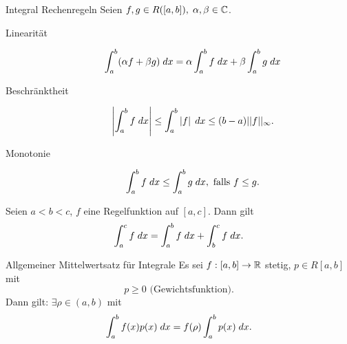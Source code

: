 \documentclass[main.tex]{subfiles}
\begin{document}
\begin{karte}{Integral Rechenregeln}
    Seien \( f,g \in R([a,b]),\; \alpha, \beta \in \C \).
    \begin{description}
        \item[Linearität] \[ \integral{(\alpha f + \beta g)}{a}{b}
        = \alpha \integral{f}{a}{b} + \beta \integral{g}{a}{b} \]
        \item[Beschränktheit] \[ \abs{\integral{f}{a}{b}} \leq 
        \integral{\abs{f}}{a}{b} 
        \leq (b-a)||f||_\infty. \]
        \item[Monotonie] \[ \integral{f}{a}{b} 
        \leq \integral{g}{a}{b}, \text{ falls } f \leq g. \]
    \end{description}
    Seien \( a < b < c \), \(f\) eine Regelfunktion auf 
    \( [a,c] \). Dann gilt 
    \[ \integral{f}{a}{c} 
    = \integral{f}{a}{b} + \integral{f}{b}{c}. \]
\end{karte}

\begin{karte}{Allgemeiner Mittelwertsatz für Integrale}
    Es sei \( \abb{f}{[a,b]}{\R} \) stetig, 
    \( p \in R[a,b] \) mit 
    \[ p \geq 0 \text{ (Gewichtsfunktion)}. \]
    Dann gilt: \( \exists \rho \in (a,b) \) mit 
    \[ \integral{f(x) p(x)}{a}{b} 
    = f(\rho) \integral{p(x)}{a}{b}. \]
\end{karte}
\end{document}

